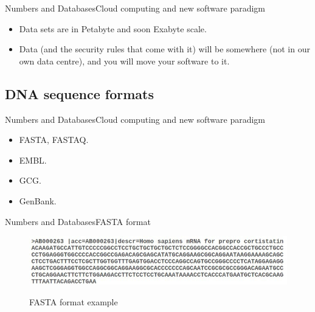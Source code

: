 \documentclass[10pt]{beamer}
\begin{document}
{%
\begin{frame}{Numbers and Databases}{Cloud computing and new software paradigm}
\begin{itemize}
\item Data sets are in Petabyte and soon Exabyte scale.
\item Data (and the security rules that come with it) will be somewhere (not in our own data centre), and you will move your software to it.
\end{itemize}
\end{frame}




\subsection{DNA sequence formats}

\begin{frame}{Numbers and Databases}{Cloud computing and new software paradigm}
\begin{itemize}
\item FASTA, FASTAQ.
\item EMBL.
\item GCG.
\item GenBank.
\end{itemize}
\end{frame}



\begin{frame}{Numbers and Databases}{FASTA format}
\begin{figure}[]
 \centering
    \includegraphics[width=\textwidth,height=0.7\textheight,keepaspectratio]{img/numbers/fasta.jpg}
    \label{img:mot2}
    \caption{FASTA format example}
\end{figure}
\end{frame}

}
\end{document}
